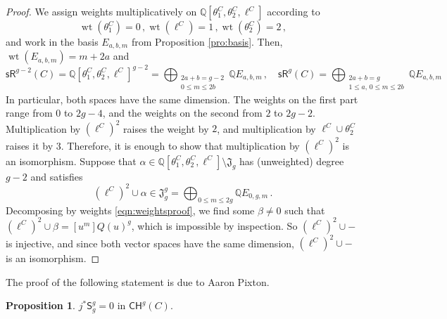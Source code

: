 \documentclass[11pt]{article}
\def\CH{\mathsf{CH}}
\def\sR{\mathsf{sR}}
\newcommand{\sfS}{\mathsf{S}}
\theoremstyle{definition}
\newtheorem{proposition}[definition]{Proposition}
\begin{document}
\begin{proof}
    We assign weights multiplicatively on $\mathbb Q[\theta_1^C, \theta_2^C, \ell^C]$ according to
    \begin{equation}\label{eqn:weightsproof}
    \operatorname{wt}(\theta_1^C) = 0\,, \operatorname{wt}(\ell^C)=1\, ,\operatorname{wt}(\theta_2^C)=2\, ,
    \end{equation}
    and work in the basis $E_{a,b,m}$ from Proposition \ref{pro:basis}. Then, $\operatorname{wt}(E_{a,b,m}) = m+2a$ and
    $$
    \sR^{g-2}(C) = \mathbb Q[\theta_1^C, \theta_2^C, \ell^C]^{g-2} =\bigoplus_{\substack{2a+b = g-2\\0 \leq m \leq 2b}}\mathbb Q E_{a,b,m}\, ,\quad \sR^{g}(C) = \bigoplus_{\substack{2a+b = g\\1\leq a,\, 0 \leq m \leq 2b}}\mathbb QE_{a,b,m}
    $$
    In particular, both spaces have the same dimension. The weights on the first part range from $0$ to $2g-4$, and the weights on the second from $2$ to $2g-2$. Multiplication by $(\ell^C)^2$ raises the weight by $2$, and multiplication by $\ell^C \cup \theta_2^C$ raises it by $3$. Therefore, it is enough to show that multiplication by $(\ell^C)^2$ is an isomorphism. Suppose that $\alpha \in \mathbb Q[\theta_1^C, \theta_2^C, \ell^C]\setminus \mathfrak J_g$ has (unweighted) degree $g-2$ and satisfies
    $$
    (\ell^C)^2\cup\alpha \in \mathfrak J_g^g = \bigoplus_{0 \leq m \leq 2g}\mathbb QE_{0,g,m}\, .
    $$
    Decomposing by weights \eqref{eqn:weightsproof}, we find some $\beta \neq 0$ such that $(\ell^C)^2 \cup \beta = [u^m]Q(u)^g$, which is impossible by inspection. So $(\ell^C)^2\cup -$ is injective, and since both vector spaces have the same dimension, $(\ell^C)^2\cup -$ is an isomorphism.
\end{proof}

The proof of the following statement is due to Aaron Pixton.
\begin{proposition}\label{pro:jS0}
    $j^*\sfS^g_g = 0$ in $\CH^g(C)$.
\end{proposition}
\end{document}
